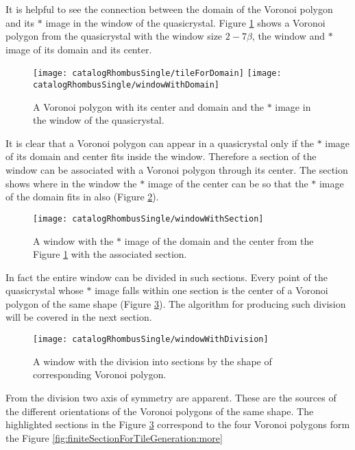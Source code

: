 \documentclass[text.tex]{subfiles}
\begin{document}
It is helpful to see the connection between the domain of the Voronoi polygon and its $\ast$ image in the window of the quasicrystal. Figure \ref{fig:windowWithDomain} shows a Voronoi polygon from the quasicrystal with the window size $2-7\beta$, the window and $\ast$ image of its domain and its center. 

\begin{figure}[h!]
\centering
\texttt{[image: catalogRhombusSingle/tileForDomain]}
\texttt{[image: catalogRhombusSingle/windowWithDomain]}
\caption{A Voronoi polygon with its center and domain and the $\ast$ image in the window of the quasicrystal.}
\label{fig:windowWithDomain}
\end{figure}

It is clear that a Voronoi polygon can appear in a quasicrystal only if the $\ast$ image of its domain and center fits inside the window. Therefore a section of the window can be associated with a Voronoi polygon through its center. The section shows where in the window the $\ast$ image of the center can be so that the $\ast$ image of the domain fits in also (Figure \ref{fig:windowWithSection}). 

\begin{figure}[h!]
\centering
\texttt{[image: catalogRhombusSingle/windowWithSection]}
\caption{A window with the $\ast$ image of the domain and the center from the Figure \ref{fig:windowWithDomain} with the associated section.}
\label{fig:windowWithSection}
\end{figure}

In fact the entire window can be divided in such sections. Every point of the quasicrystal whose $\ast$ image falls within one section is the center of a Voronoi polygon of the same shape (Figure \ref{fig:windowWithDivision}). The algorithm for producing such division will be covered in the next section.  

\begin{figure}[h!]
\centering
\texttt{[image: catalogRhombusSingle/windowWithDivision]}
\caption{A window with the division into sections by the shape of corresponding Voronoi polygon.}
\label{fig:windowWithDivision}
\end{figure}

From the division two axis of symmetry are apparent. These are the sources of the different orientations of the Voronoi polygons of the same shape. The highlighted sections in the Figure \ref{fig:windowWithDivision} correspond to the four Voronoi polygons form the Figure \ref{fig:finiteSectionForTileGeneration:more}
\end{document}
